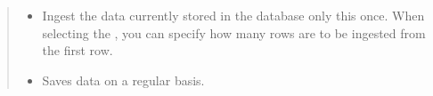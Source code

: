 \documentclass[letterpaper,10pt,english]{sphinxmanual}
\begin{document}
\begin{enumerate}
\begin{quote}
\begin{figure}[H]
\noindent{}
\end{figure}
\begin{itemize}
\item {} 
 Ingest the data currently stored in the database only this once. When selecting the , you can specify how many rows are to be ingested from the first row.
\begin{quote}

\begin{figure}[H]
\centering

\noindent{}
\end{figure}
\end{quote}

\item {} 
 Saves data on a regular basis.
\begin{quote}

\begin{figure}[H]
\centering

\noindent{}
\end{figure}
\end{quote}

\end{itemize}
\end{quote}

\end{enumerate}
\end{document}
